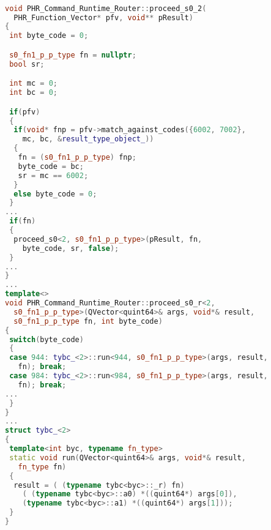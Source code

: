\begin{lstlisting}[caption={PVM Runtime: Function Equivalence Classes},
language = C++, numbers = none, label={lst:figPVMrt},
    basicstyle = \ttfamily\bfseries\tiny, linewidth = .95\linewidth] 

void PHR_Command_Runtime_Router::proceed_s0_2(
  PHR_Function_Vector* pfv, void** pResult)
{
 int byte_code = 0;

 s0_fn1_p_p_type fn = nullptr;
 bool sr;

 int mc = 0;
 int bc = 0;

 if(pfv)
 {
  if(void* fnp = pfv->match_against_codes({6002, 7002}, 
    mc, bc, &result_type_object_))
  {
   fn = (s0_fn1_p_p_type) fnp;
   byte_code = bc;
   sr = mc == 6002;
  }
  else byte_code = 0;
 }
... 
 if(fn)
 {
  proceed_s0<2, s0_fn1_p_p_type>(pResult, fn, 
    byte_code, sr, false);
 }
...
}
...
template<>
void PHR_Command_Runtime_Router::proceed_s0_r<2, 
  s0_fn1_p_p_type>(QVector<quint64>& args, void*& result,
  s0_fn1_p_p_type fn, int byte_code)
{
 switch(byte_code)
 {
 case 944: tybc_<2>::run<944, s0_fn1_p_p_type>(args, result, 
   fn); break;
 case 984: tybc_<2>::run<984, s0_fn1_p_p_type>(args, result, 
   fn); break;
...
 }
}
...
struct tybc_<2>
{
 template<int byc, typename fn_type>
 static void run(QVector<quint64>& args, void*& result,
   fn_type fn)
 {
  result = ( (typename tybc<byc>::_r) fn)
    ( (typename tybc<byc>::a0) *((quint64*) args[0]),  
    (typename tybc<byc>::a1) *((quint64*) args[1]));
 }
}


\end{lstlisting}
